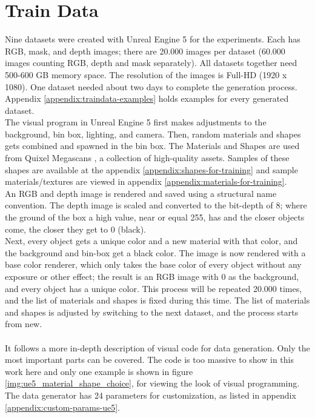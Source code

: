 	\section{Train Data}
	\label{sec:data}
		Nine datasets were created with Unreal Engine 5 \cite{ue5} for the experiments. Each has RGB, mask, and depth images; there are 20.000 images per dataset (60.000 images counting RGB, depth and mask separately). All datasets together need 500-600 GB memory space. The resolution of the images is Full-HD (1920 x 1080). One dataset needed about two days to complete the generation process. Appendix \ref{appendix:traindata-examples} holds examples for every generated dataset.\\
		The visual program in Unreal Engine 5 first makes adjustments to the background, bin box, lighting, and camera. Then, random materials and shapes gets combined and spawned in the bin box. The Materials and Shapes are used from Quixel Megascans \cite{Quixel}, a collection of high-quality assets. Samples of these shapes are available at the appendix \ref{appendix:shapes-for-training} and sample materials/textures are viewed in appendix \ref{appendix:materials-for-training}.\\
		An RGB and depth image is rendered and saved using a structural name convention. The depth image is scaled and converted to the bit-depth of 8; where the ground of the box a high value, near or equal 255, has and the closer objects come, the closer they get to 0 (black).\\
		Next, every object gets a unique color and a new material with that color, and the background and bin-box get a black color. The image is now rendered with a base color renderer, which only takes the base color of every object without any exposure or other effect; the result is an RGB image with 0 as the background, and every object has a unique color. This process will be repeated 20.000 times, and the list of materials and shapes is fixed during this time. The list of materials and shapes is adjusted by switching to the next dataset, and the process starts from new.\\
		\\
		It follows a more in-depth description of visual code for data generation. Only the most important parts can be covered. The code is too massive to show in this work here and only one example is shown in figure \ref{img:ue5_material_shape_choice}, for viewing the look of visual programming.\\
		The data generator has 24 parameters for customization, as listed in appendix \ref{appendix:custom-params-ue5}.\\
